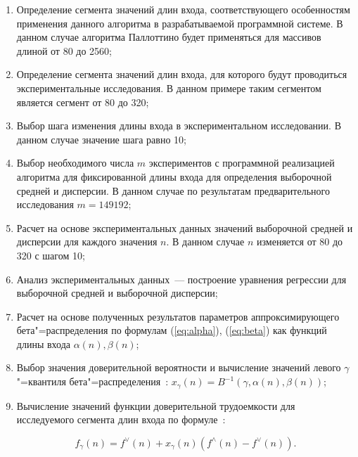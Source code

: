 \documentclass[a4paper,fontsize=14pt]{article}
\begin{document}
\begin{enumerate}
	\item Определение сегмента значений длин входа, соответствующего особенностям применения данного алгоритма в разрабатываемой
	программной системе. В данном случае алгоритма Паллоттино будет применяться для массивов длиной от 80 до 2560;
	
	\item Определение сегмента значений длин входа, для которого будут проводиться экспериментальные исследования. В данном примере таким сегментом является сегмент от 80 до 320;
	
	\item Выбор шага изменения длины входа в экспериментальном исследовании. В данном случае значение шага равно 10;
	
	\item Выбор необходимого числа $m$ экспериментов с программной реализацией алгоритма для фиксированной длины входа для определения выборочной средней и дисперсии. В данном случае по результатам предварительного исследования $m = 149192$;
	
	\item Расчет на основе экспериментальных данных значений выборочной средней и дисперсии для каждого значения $n$. В данном случае $n$ изменяется от 80 до 320 с шагом 10;
	
	\item Анализ экспериментальных данных~--- построение уравнения регрессии для выборочной средней и выборочной дисперсии;
	
	\item Расчет на основе полученных результатов параметров аппроксимирующего бета"=распределения по формулам (\ref{eq:alpha}), (\ref{eq:beta}) как функций длины входа $\alpha(n), \beta(n)$;
	
	\item Выбор значения доверительной вероятности и вычисление значений левого $\gamma$"=квантиля бета"=распределения~\cite{petrushyn_ulyanov_analysis}: $x_\gamma(n) = B^{-1}(\gamma, \alpha(n), \beta(n))$;
	
	\item Вычисление значений функции доверительной трудоемкости для исследуемого сегмента длин входа по формуле~\cite{petrushyn_ulyanov_analysis}:
	
	\begin{equation}\label{eq:final_complexity_fucntion}
	f_\gamma(n) = f^\vee(n) + x_\gamma(n) (f^\wedge(n) - f^\vee(n)).
	\end{equation}
\end{enumerate}
\end{document}
